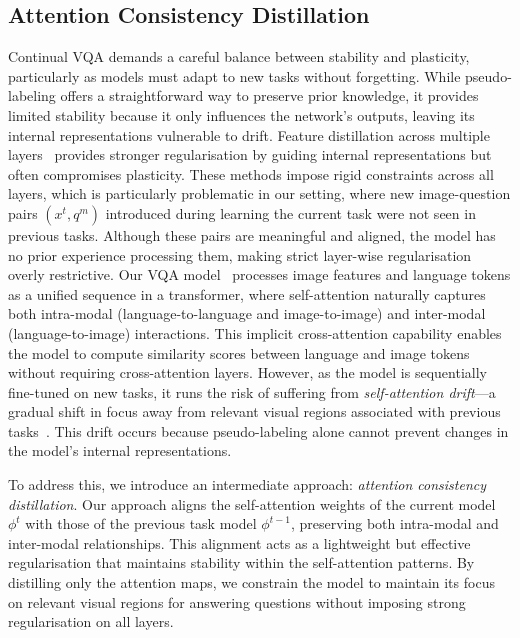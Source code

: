 \subsection{Attention Consistency Distillation}
Continual VQA demands a careful balance between stability and plasticity, particularly as models must adapt to new tasks without forgetting. While pseudo-labeling offers a straightforward way to preserve prior knowledge, it provides limited stability because it only influences the network's outputs, leaving its internal representations vulnerable to drift. Feature distillation across multiple layers~\cite{Kang2022afc, xu2023multi,dhar2019learning, pelosin2022towards} provides stronger regularisation by guiding internal representations but often compromises plasticity. These methods impose rigid constraints across all layers, which is particularly problematic in our setting, where new image-question pairs $(x^t, q^m)$ introduced during learning the current task were not seen in previous tasks. Although these pairs are meaningful and aligned, the model has no prior experience processing them, making strict layer-wise regularisation overly restrictive. Our VQA model~\cite{zhang2023vqacl, nikandrou2022task} processes image features and language tokens as a unified sequence in a transformer, where self-attention naturally captures both intra-modal (language-to-language and image-to-image) and inter-modal (language-to-image) interactions. This implicit cross-attention capability enables the model to compute similarity scores between language and image tokens without requiring cross-attention layers. However, as the model is sequentially fine-tuned on new tasks, it runs the risk of suffering from \textit{self-attention drift}—a gradual shift in focus away from relevant visual regions associated with previous tasks~\cite{voita2019analyzing, godey2024anisotropy}. This drift occurs because pseudo-labeling alone cannot prevent changes in the model's internal representations. 

To address this, we introduce an intermediate approach: \textit{attention consistency distillation}. Our approach aligns the self-attention weights of the current model $\phi^t$ with those of the previous task model $\phi^{t-1}$, preserving both intra-modal and inter-modal relationships. This alignment acts as a lightweight but effective regularisation that maintains stability within the self-attention patterns. By distilling only the attention maps, we constrain the model to maintain its focus on relevant visual regions for answering questions without imposing strong regularisation on all layers. 

